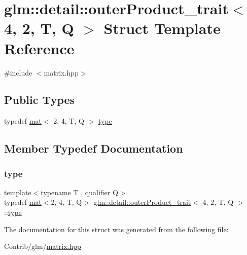\hypertarget{structglm_1_1detail_1_1outer_product__trait_3_014_00_012_00_01_t_00_01_q_01_4}{}\section{glm\+:\+:detail\+:\+:outer\+Product\+\_\+trait$<$ 4, 2, T, Q $>$ Struct Template Reference}
\label{structglm_1_1detail_1_1outer_product__trait_3_014_00_012_00_01_t_00_01_q_01_4}


{\ttfamily \#include $<$matrix.\+hpp$>$}

\subsection*{Public Types}
\begin{DoxyCompactItemize}
\item 
typedef \mbox{\hyperlink{structglm_1_1mat}{mat}}$<$ 2, 4, T, Q $>$ \mbox{\hyperlink{structglm_1_1detail_1_1outer_product__trait_3_014_00_012_00_01_t_00_01_q_01_4_a147defb160b17d4193e19a64618c035e}{type}}
\end{DoxyCompactItemize}


\subsection{Member Typedef Documentation}
\mbox{\label{structglm_1_1detail_1_1outer_product__trait_3_014_00_012_00_01_t_00_01_q_01_4_a147defb160b17d4193e19a64618c035e}} 
\subsubsection{\texorpdfstring{type}{type}}
{\footnotesize\ttfamily template$<$typename T , qualifier Q$>$ \\
typedef \mbox{\hyperlink{structglm_1_1mat}{mat}}$<$2, 4, T, Q$>$ \mbox{\hyperlink{structglm_1_1detail_1_1outer_product__trait}{glm\+::detail\+::outer\+Product\+\_\+trait}}$<$ 4, 2, T, Q $>$\+::\mbox{\hyperlink{structglm_1_1detail_1_1outer_product__trait_3_014_00_012_00_01_t_00_01_q_01_4_a147defb160b17d4193e19a64618c035e}{type}}}



The documentation for this struct was generated from the following file\+:\begin{DoxyCompactItemize}
\item 
Contrib/glm/\mbox{\hyperlink{matrix_8hpp}{matrix.\+hpp}}\end{DoxyCompactItemize}
